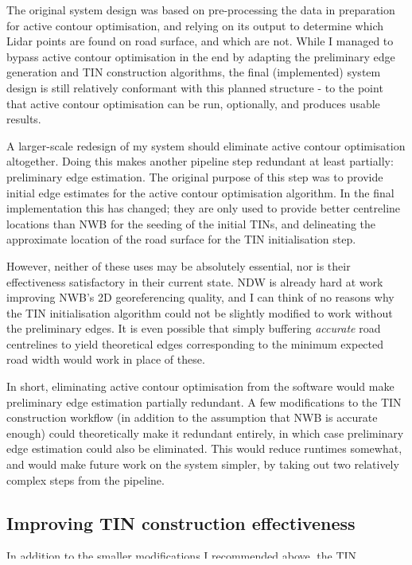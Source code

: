 The original system design was based on pre-processing the data in preparation for active contour optimisation, and relying on its output to determine which Lidar points are found on road surface, and which are not. While I managed to bypass active contour optimisation in the end by adapting the preliminary edge generation and TIN construction algorithms, the final (implemented) system design is still relatively conformant with this planned structure - to the point that active contour optimisation can be run, optionally, and produces usable results.

A larger-scale redesign of my system should eliminate active contour optimisation altogether. Doing this makes another pipeline step redundant at least partially: preliminary edge estimation. The original purpose of this step was to provide initial edge estimates for the active contour optimisation algorithm. In the final implementation this has changed; they are only used to provide better centreline locations than NWB for the seeding of the initial TINs, and delineating the approximate location of the road surface for the TIN initialisation step.

However, neither of these uses may be absolutely essential, nor is their effectiveness satisfactory in their current state. NDW is already hard at work improving NWB's 2D georeferencing quality, and I can think of no reasons why the TIN initialisation algorithm could not be slightly modified to work without the preliminary edges. It is even possible that simply buffering \textit{accurate} road centrelines to yield theoretical edges corresponding to the minimum expected road width would work in place of these.

In short, eliminating active contour optimisation from the software would make preliminary edge estimation partially redundant. A few modifications to the TIN construction workflow (in addition to the assumption that NWB is accurate enough) could theoretically make it redundant entirely, in which case preliminary edge estimation could also be eliminated. This would reduce runtimes somewhat, and would make future work on the system simpler, by taking out two relatively complex steps from the pipeline.

\subsection{Improving TIN construction effectiveness}
\label{sub:improvementstinconstruction}

In addition to the smaller modifications I recommended above, the TIN construction step could also use a few modifications. Based on my experience in working with the implemented system design, the approach works well, but there is one further component that could improve the results of the procedure.

